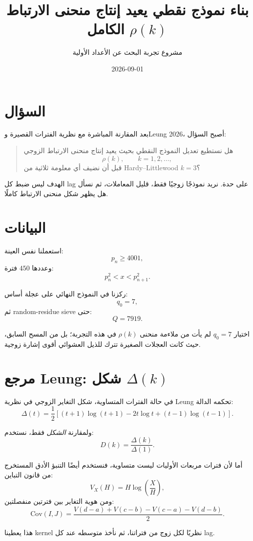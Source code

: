 \documentclass[12pt]{article}
\title{بناء نموذج نقطي يعيد إنتاج منحنى الارتباط الكامل \(\rho(k)\)}
\author{مشروع تجربة البحث عن الأعداد الأولية}
\date{2026-09-01}
\begin{document}
\maketitle

\section{السؤال}

بعد المقارنة المباشرة مع نظرية الفترات القصيرة وLeung 2026، أصبح السؤال:

\begin{quote}
هل نستطيع تعديل النموذج النقطي بحيث يعيد إنتاج منحنى الارتباط الزوجي
\[
\rho(k),\qquad k=1,2,\ldots,
\]
قبل أن نضيف أي معلومة ثلاثية من Hardy--Littlewood \(k=3\)؟
\end{quote}

الهدف ليس ضبط كل lag على حدة. نريد نموذجًا زوجيًا فقط، قليل المعاملات،
ثم نسأل هل يظهر شكل منحنى الارتباط كاملًا.

\section{البيانات}

استعملنا نفس العينة:
\[
p_n\ge 4001,
\]
وعددها \(450\) فترة:
\[
p_n^2<x<p_{n+1}^2.
\]

ركزنا في النموذج النهائي على عجلة أساس:
\[
q_0=7,
\]
ثم random-residue sieve حتى:
\[
Q=7919.
\]

اختيار \(q_0=7\) لم يأت من ملاءمة منحنى \(\rho(k)\) في هذه التجربة؛
بل من المسح السابق، حيث كانت العجلات الصغيرة تترك للذيل العشوائي
أقوى إشارة زوجية.

\section{مرجع Leung: شكل \(\Delta(k)\)}

في حالة الفترات المتساوية، شكل التغاير الزوجي في نظرية Leung تحكمه الدالة:
\[
\Delta(t)
=
\frac12\left[
(t+1)\log(t+1)
-2t\log t
+(t-1)\log(t-1)
\right].
\]

ولمقارنة \emph{الشكل} فقط، نستخدم:
\[
D(k)
=
\frac{\Delta(k)}{\Delta(1)}.
\]

أما لأن فترات مربعات الأوليات ليست متساوية، فنستخدم أيضًا التنبؤ الأدق
المستخرج من قانون التباين:
\[
V_X(H)=H\log\left(\frac{X}{H}\right),
\]
ومن هوية التغاير بين فترتين منفصلتين:
\[
\mathrm{Cov}(I,J)
=
\frac{
V(d-a)+V(c-b)-V(c-a)-V(d-b)
}{2}.
\]

هذا يعطينا kernel نظريًا لكل زوج من فتراتنا، ثم نأخذ متوسطه عند كل lag.
\end{document}
